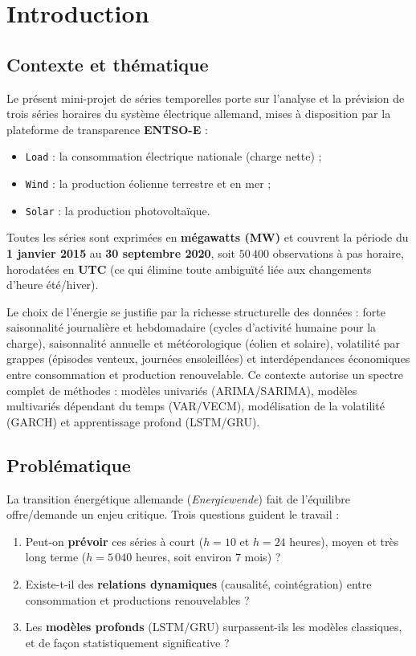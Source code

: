 \section{Introduction}
\subsection{Contexte et thématique}
Le présent mini-projet de séries temporelles porte sur l'analyse et la prévision
de trois séries horaires du système électrique allemand, mises à disposition
par la plateforme de transparence \textbf{ENTSO-E} :
\begin{itemize}
  \item \texttt{Load} : la consommation électrique nationale (charge nette) ;
  \item \texttt{Wind} : la production éolienne terrestre et en mer ;
  \item \texttt{Solar} : la production photovoltaïque.
\end{itemize}
Toutes les séries sont exprimées en \textbf{mégawatts (MW)} et couvrent la
période du \textbf{1\ier{} janvier 2015} au \textbf{30 septembre 2020}, soit
\(50\,400\) observations à pas horaire, horodatées en \textbf{UTC} (ce qui
élimine toute ambiguïté liée aux changements d'heure été/hiver).

Le choix de l'énergie se justifie par la richesse structurelle des données :
forte saisonnalité journalière et hebdomadaire (cycles d'activité humaine pour
la charge), saisonnalité annuelle et météorologique (éolien et solaire),
volatilité par grappes (épisodes venteux, journées ensoleillées) et
interdépendances économiques entre consommation et production renouvelable.
Ce contexte autorise un spectre complet de méthodes : modèles univariés
(ARIMA/SARIMA), modèles multivariés dépendant du temps (VAR/VECM),
modélisation de la volatilité (GARCH) et apprentissage profond (LSTM/GRU).

\subsection{Problématique}
La transition énergétique allemande (\emph{Energiewende}) fait de l'équilibre
offre/demande un enjeu critique. Trois questions guident le travail :
\begin{enumerate}
  \item Peut-on \textbf{prévoir} ces séries à court (\(h=10\) et \(h=24\)
        heures), moyen et très long terme (\(h=5\,040\) heures, soit environ
        \(7\) mois) ?
  \item Existe-t-il des \textbf{relations dynamiques} (causalité, cointégration)
        entre consommation et productions renouvelables ?
  \item Les \textbf{modèles profonds} (LSTM/GRU) surpassent-ils les modèles
        classiques, et de façon statistiquement significative ?
\end{enumerate}


